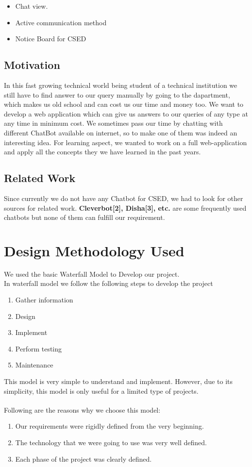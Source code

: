 \documentclass{mnnit}
\begin{document}
\begin{itemize}
	\item Chat view.
	\item Active communication method
	\item Notice Board for CSED
\end{itemize}


\section{Motivation}
In this fast growing technical world being student of a technical institution we
still have to find answer to our query manually by going to the dapartment, which
makes us old school and can cost us our time and money too. We want to develop a
web application which can give us answers to our queries of any type at any time
in minimum cost. We sometimes pass our time by chatting with different ChatBot
available on internet, so to make one of them was indeed an interesting idea. For
learning aspect, we wanted to work on a full web-application and apply all the
concepts they we have learned in the past years.

\section{Related Work}
Since currently we do not have any Chatbot for CSED, we had to look for other
sources for related work. \textbf{Cleverbot[2], Disha[3], etc.} are some
frequently used chatbots but none of them can fulfill our requirement.

\chapter{Design Methodology Used}
We used the basic Waterfall Model to Develop our project.\\
In waterfall model we follow the following steps to develop the project
\begin{enumerate}
\item Gather information
\item Design
\item Implement
\item Perform testing
\item Maintenance
\end{enumerate}
This model is very simple to understand and implement. However, due to its\\
simplicity, this model is only useful for a limited type of projects.\\\\
Following are the reasons why we choose this model:
\begin{enumerate}
\item Our requirements were rigidly defined from the very beginning.
\item The technology that we were going to use was very well defined.
\item Each phase of the project was clearly defined.
\end{enumerate}
\end{document}

